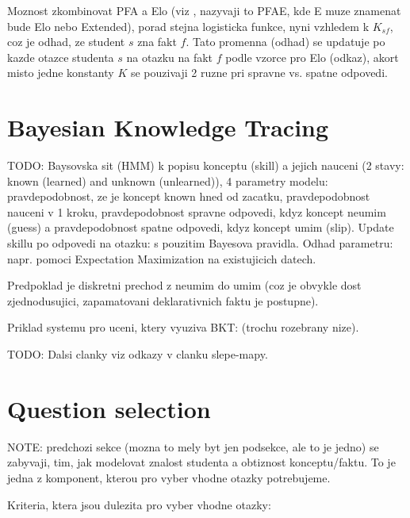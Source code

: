 \documentclass[a4paper, 12pt, twoside]{fithesis2}		%
\renewcommand{\_}{\leavevmode \kern0.0em\vbox{\hrule width0.4em}}
\begin{document}
Moznost zkombinovat PFA a Elo (viz \cite{slepe-mapy}, nazyvaji to PFAE, kde E muze znamenat bude Elo nebo Extended), porad stejna logisticka funkce, nyni vzhledem k $K_{sf}$, coz je odhad, ze student $s$ zna fakt $f$. Tato promenna (odhad) se updatuje po kazde otazce studenta $s$ na otazku na fakt $f$ podle vzorce pro Elo (odkaz), akort misto jedne konstanty $K$ se pouzivaji 2 ruzne pri spravne vs. spatne odpovedi.


\section{Bayesian Knowledge Tracing}
\label{sec:bayesian-network}

TODO: Baysovska sit (HMM) k popisu konceptu (skill) a jejich nauceni (2 stavy: known (learned) and unknown (unlearned)), 4 parametry modelu: pravdepodobnost, ze je koncept known hned od zacatku, pravdepodobnost nauceni v 1 kroku, pravdepodobnost spravne odpovedi, kdyz koncept neumim (guess) a pravdepodobnost spatne odpovedi, kdyz koncept umim (slip).
Update skillu po odpovedi na otazku: s pouzitim Bayesova pravidla.
Odhad parametru: napr. pomoci Expectation Maximization na existujicich datech.

Predpoklad je diskretni prechod z neumim do umim (coz je obvykle dost zjednodusujici, zapamatovani deklarativnich faktu je postupne).

Priklad systemu pro uceni, ktery vyuziva BKT: \cite{question-gen-adapt-bayes} (trochu rozebrany nize).

TODO: Dalsi clanky viz odkazy v clanku slepe-mapy.


\section{Question selection}
\label{sec:question-selection}

NOTE: predchozi sekce (mozna to mely byt jen podsekce, ale to je jedno) se zabyvaji, tim, jak modelovat znalost studenta a obtiznost konceptu/faktu. To je jedna z komponent, kterou pro vyber vhodne otazky potrebujeme.

Kriteria, ktera jsou dulezita pro vyber vhodne otazky:
\end{document}
